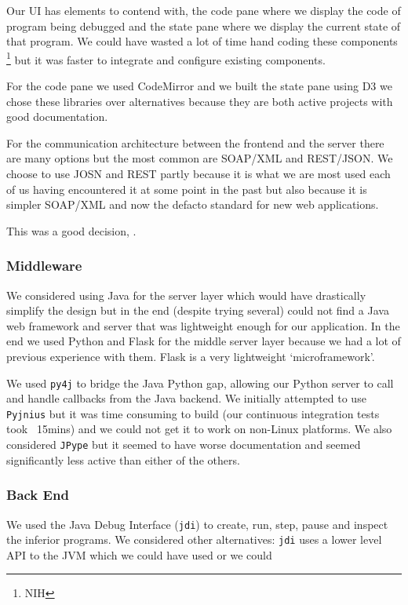 \documentclass[11pt, a4paper]{article}
\newcommand{\cmd}[1]{{\tt #1}}
\begin{document}
Our UI has elements to contend with, the code pane where we display the code of program being debugged and the state pane where we display the current state of that program.
We could have wasted a lot of time hand coding these components \footnote{NIH} but it was faster to integrate and configure existing components.

For the code pane we used CodeMirror and we built the state pane using D3 we chose these libraries over alternatives because they are both active projects with good documentation. 

For the communication architecture between the frontend and the server there are many options but the most common are SOAP/XML and REST/JSON.
We choose to use JOSN and REST partly because it is what we are most used each of us having encountered it at some point in the past but also because it is simpler SOAP/XML and now the defacto standard for new web applications.

This was a good decision, .

\subsubsection{Middleware}
We considered using Java for the server layer which would have drastically simplify the design but in the end (despite trying several) could not find a Java web framework and server that was lightweight enough for our application. 
In the end we used Python and Flask for the middle server layer because we had a lot of previous experience with them.
Flask is a very lightweight `microframework'.

We used \cmd{py4j} to bridge the Java Python gap, allowing our Python server to call and handle callbacks from the Java backend.
We initially attempted to use \cmd{Pyjnius} but it was time consuming to build (our continuous integration tests took ~15mins) and we could not get it to work on non-Linux platforms.
We also considered \cmd{JPype} but it seemed to have worse documentation and seemed significantly less active than either of the others.    

\subsubsection{Back End}
We used the Java Debug Interface (\cmd{jdi}) to create, run, step, pause and inspect the inferior programs.
We considered other alternatives: \cmd{jdi} uses a lower level API to the JVM which we could have used or we could 
\end{document}
